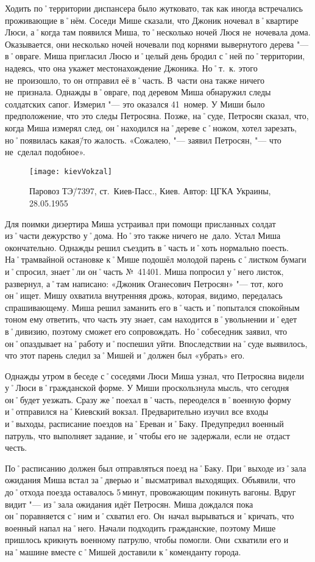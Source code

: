 Ходить по˚территории диспансера было жутковато, так как иногда встречались проживающие в˚нём. Соседи Мише сказали, что Джоник ночевал в˚квартире Люси, а˚когда там появился Миша, то˚несколько ночей Люся не~ночевала дома. Оказывается, они несколько ночей ночевали под корнями вывернутого дерева "--- в˚овраге. Миша пригласил Люсю и˚целый день бродил с˚ней по˚территории, надеясь, что она укажет местонахождение Джоника. Но˚т.~к. этого не~произошло, то он отправил её в˚часть. В~части она также ничего не~признала. Однажды в˚овраге, под деревом Миша обнаружил следы солдатских сапог. Измерил "--- это оказался 41~номер. У Миши  было предположение, что это следы Петросяна. Позже, на˚суде, Петросян сказал, что, когда Миша измерял след, он˚находился на˚дереве с˚ножом, хотел зарезать, но˚появилась какая\=/то жалость. «Сожалею, "--- заявил Петросян, "--- что не~сделал подобное».  

\begin{wrapfigure}{O}{.4\textwidth}
\centering
\texttt{[image: kievVokzal]}
\caption{Паровоз ТЭ\=/7397, ст.~Киев-Пасс., Киев. Автор: ЦГКА Украины, 28.05.1955}
\label{fig:kievVokzal}
\end{wrapfigure}

Для поимки дизертира Миша устраивал при помощи присланных солдат из˚части дежурство у˚дома. Но˚это также ничего не~дало. Устал Миша окончательно. Однажды решил съездить в˚часть и˚хоть нормально поесть. На˚трамвайной остановке к˚Мише подошёл молодой парень с˚листком бумаги и˚спросил, знает˚ли он˚часть №~41401. Миша попросил у˚него листок, развернул, а˚там написано: «Джоник Оганесович Петросян» "--- тот, кого он˚ищет. Мишу охватила внутренняя дрожь, которая, видимо, передалась спрашивающему. Миша решил заманить его в˚часть и˚попытался спокойным тоном ему ответить, что часть эту знает, сам находится в˚увольнении и˚едет в˚дивизию, поэтому сможет его сопровождать.  Но˚собеседник заявил, что он˚опаздывает на˚работу и˚поспешил уйти. Впоследствии на˚суде выявилось, что этот парень следил за˚Мишей и˚должен был «убрать» его.

Однажды утром в беседе с˚соседями Люси Миша узнал, что Петросяна видели у˚Люси в˚гражданской форме. У Миши проскользнула мысль, что сегодня он˚будет уезжать. Сразу же˚поехал в˚часть, переоделся в˚военную форму и˚отправился на˚Киевский вокзал. Предварительно изучил все входы и˚выходы, расписание поездов на˚Ереван и˚Баку. Предупредил военный патруль, что выполняет задание, и˚чтобы его не~задержали, если не~отдаст честь. 

По˚расписанию должен был отправляться поезд на˚Баку. При˚выходе из˚зала ожидания Миша встал за˚дверью и˚высматривал выходящих. Объявили, что до˚отхода поезда оставалось 5\,минут, провожающим покинуть вагоны. Вдруг видит "--- из˚зала ожидания идёт Петросян. Миша дождался пока он˚поравняется с˚ним и˚схватил его. Он~начал вырываться и˚кричать, что военный напал на˚него. Начали подходить гражданские, поэтому Мише пришлось крикнуть военному патрулю, чтобы помогли. Они~схватили его и на˚машине вместе с˚Мишей доставили к˚коменданту города. 

